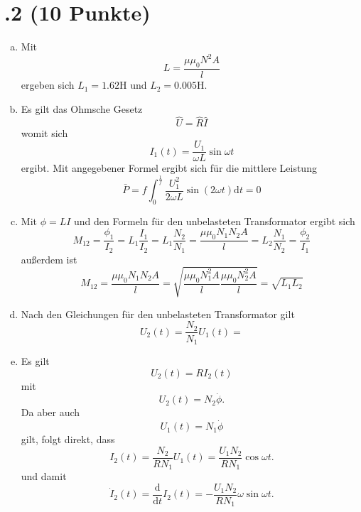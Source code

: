 \section*{\nr.2 \tittwo (10 Punkte)}
\begin{enumerate}[(a)]
\item Mit
\begin{equation}
  L=\frac{\mu\mu_0N^2A}{l}
\end{equation}
ergeben sich $L_1=1.62\mathrm{H}$ und $L_2=0.005\mathrm{H}$.
\item Es gilt das Ohmsche Gesetz
\begin{equation}
  \hat{U}=\hat{R}\hat{I}
\end{equation}
womit sich 
\begin{equation}
  I_1(t)=\frac{U_1}{\omega L}\sin \omega t
\end{equation}
ergibt.
Mit angegebener Formel ergibt sich für die mittlere Leistung
\begin{equation}
  \bar{P}=f\int_0^{\frac{1}{f}}\frac{U_1^2}{2\omega L}\sin (2\omega t) \mathrm{d}t=0
\end{equation}
\item Mit $\phi =LI$ und den Formeln für den unbelasteten Transformator ergibt sich
\begin{equation}
  M_{12}=\frac{\phi_1}{I_2}=L_1 \frac{I_1}{I_2}=L_1 \frac{N_2}{N_1}=\frac{\mu\mu_0N_1N_2A}{l}=L_2 \frac{N_1}{N_2}=\frac{\phi_2}{I_1}
\end{equation}
außerdem ist
\begin{equation}
  M_{12}=\frac{\mu\mu_0N_1N_2A}{l}=\sqrt{\frac{\mu\mu_0N_1^2A}{l}\frac{\mu\mu_0N_2^2A}{l}}=\sqrt{L_1L_2}
\end{equation}

\item Nach den Gleichungen für den unbelasteten Transformator gilt
\begin{equation}
  U_2(t)=\frac{N_2}{N_1}U_1(t)=
\end{equation}

\item Es gilt
\begin{equation}
  U_2(t)=RI_2(t)
\end{equation}
mit 
\begin{equation}
  U_2(t)=N_2 \dot{\phi}.
\end{equation}
Da aber auch
\begin{equation}
  U_1(t)=N_1\dot{\phi}
\end{equation}
gilt, folgt direkt, dass
\begin{equation}
  I_2(t)=\frac{N_2}{RN_1}U_1(t)=\frac{U_1N_2}{RN_1}\cos \omega t.
\end{equation}
und damit
\begin{equation}
  \dot{I}_2(t)=\frac{\mathrm{d}}{\mathrm{d}t} I_2(t)=-\frac{U_1N_2}{RN_1}\omega \sin \omega t.
\end{equation}


\end{enumerate}
